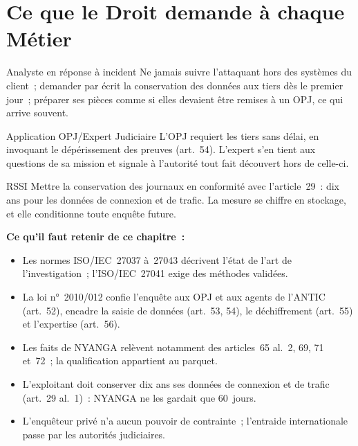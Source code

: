 \section{Ce que le Droit demande à chaque Métier}
\label{sec:c08-metiers}

\begin{boxmetier}{Analyste en réponse à incident}
Ne jamais suivre l'attaquant hors des systèmes du client~; demander par
écrit la conservation des données aux tiers dès le premier jour~; préparer
ses pièces comme si elles devaient être remises à un OPJ, ce qui arrive
souvent.
\end{boxmetier}

\begin{boxmetier}{Application OPJ/Expert Judiciaire}
L'OPJ requiert les tiers sans délai, en invoquant le dépérissement des
preuves (art.~54). L'expert s'en tient aux questions de sa mission et signale
à l'autorité tout fait découvert hors de celle-ci.
\end{boxmetier}

\begin{boxmetier}{RSSI}
Mettre la conservation des journaux en conformité avec l'article~29~: dix
ans pour les données de connexion et de trafic. La mesure se chiffre en
stockage, et elle conditionne toute enquête future.
\end{boxmetier}

\separateur

\begin{boxresume}
\textbf{Ce qu'il faut retenir de ce chapitre~:}
\begin{itemize}
    \item Les normes ISO/IEC~27037 à~27043 décrivent l'état de l'art de
          l'investigation~; l'ISO/IEC~27041 exige des méthodes validées.
    \item La loi n°~2010/012 confie l'enquête aux OPJ et aux agents de
          l'ANTIC (art.~52), encadre la saisie de données (art.~53, 54), le
          déchiffrement (art.~55) et l'expertise (art.~56).
    \item Les faits de NYANGA relèvent notamment des articles~65 al.~2,
          69, 71 et~72~; la qualification appartient au parquet.
    \item L'exploitant doit conserver dix ans ses données de connexion et
          de trafic (art.~29 al.~1)~: NYANGA ne les gardait que 60~jours.
    \item L'enquêteur privé n'a aucun pouvoir de contrainte~; l'entraide
          internationale passe par les autorités judiciaires.
\end{itemize}
\end{boxresume}

